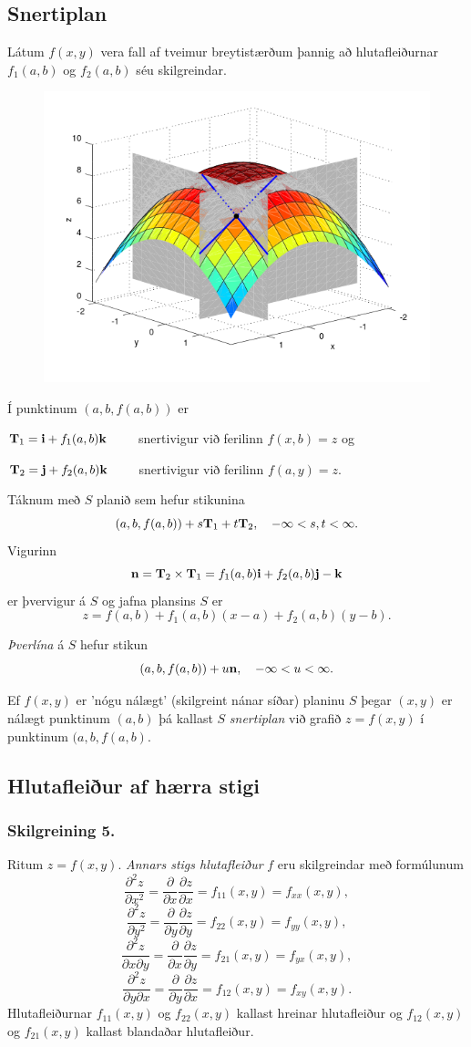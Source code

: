 \subsection{Snertiplan}
  Látum $f(x,y)$ vera fall af tveimur breytistærðum þannig að hlutafleiðurnar $f_1(a,b)$ og $f_2(a,b)$ séu skilgreindar.
  \begin{figure}
           \centering
            \includegraphics[width=0.6\linewidth]{bothpart.png}
    \end{figure}
    Í punktinum $(a,b,f(a,b))$ er 
    
    $\mbox{${\bf T}$}_1 = \mbox{${\bf i}$} + f_1(a,b)\mbox{${\bf k}$}\qquad$ snertivigur við ferilinn $f(x,b) = z$ og
    
    $\mbox{${\bf T}$}_2 = \mbox{${\bf j}$} + f_2(a,b)\mbox{${\bf k}$}\qquad$ snertivigur við ferilinn $f(a,y) = z$.



 Táknum með $S$ planið sem hefur stikunina
$$(a,b,f(a,b))+s\mbox{${\bf T}$}_1+t\mbox{${\bf T}$}_2, \quad -\infty < s,t < \infty.$$
Vigurinn 
$$\mbox{${\bf n}$}=\mbox{${\bf T}$}_2\times \mbox{${\bf T}$}_1=f_1(a,b)\mbox{${\bf i}$}+f_2(a,b)\mbox{${\bf j}$}-\mbox{${\bf k}$}$$
er þvervigur á $S$ og jafna plansins $S$ er
$$z=f(a,b)+f_1(a,b)(x-a)+f_2(a,b)(y-b).$$

\emph{Þverlína} á $S$ hefur stikun
$$(a,b,f(a,b)) + u \mbox{${\bf n}$}, \quad -\infty < u < \infty.$$

Ef $f(x,y)$ er 'nógu nálægt' (skilgreint nánar síðar) planinu $S$ þegar $(x,y)$ er nálægt punktinum $(a,b)$ þá kallast $S$ \emph{snertiplan} við grafið $z=f(x,y)$ í punktinum $(a,b,f(a,b)$.


\subsection{Hlutafleiður af hærra stigi}
 \subsubsection{Skilgreining 5.}
  Ritum $z=f(x,y)$.  {\em Annars stigs
  hlutafleiður} $f$ eru skilgreindar með formúlunum
$$\frac{\partial^2 z}{\partial x^2}=
\frac{\partial}{\partial x} \frac{\partial z}{\partial x}
=f_{11}(x,y)=f_{xx}(x,y),$$
$$\frac{\partial^2 z}{\partial y^2}=
\frac{\partial}{\partial y} \frac{\partial z}{\partial y}
=f_{22}(x,y)=f_{yy}(x,y),$$
$$\frac{\partial^2 z}{\partial x\partial y}=
\frac{\partial}{\partial x} \frac{\partial z}{\partial y}
=f_{21}(x,y)=f_{yx}(x,y),$$
$$\frac{\partial^2 z}{\partial y\partial x}=
\frac{\partial}{\partial y} \frac{\partial z}{\partial x}
=f_{12}(x,y)=f_{xy}(x,y).$$
Hlutafleiðurnar $f_{11}(x,y)$ og $f_{22}(x,y)$ kallast hreinar
hlutafleiður og $f_{12}(x,y)$ og $f_{21}(x,y)$ kallast blandaðar
hlutafleiður.  
 

